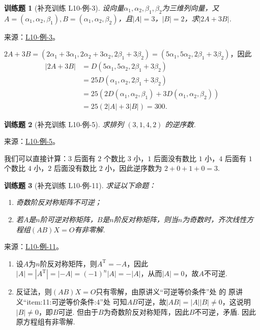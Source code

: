 \documentclass[UTF8,12pt,a4paper,fontset=fandol]{ctexart}
\newtheorem{exercise}{训练题}[section]
\begin{document}
\begin{exercise}[补充训练 L10-例-3]\label{prob:L10-例-3}
设向量$\alpha_1,\alpha_2,\beta_1,\beta_2$为三维列向量，又$A=(\alpha_1,\alpha_2,\beta_1),B=(\alpha_1,\alpha_2,\beta_2)$，且$|A|=3$，$|B|=2$，求$|2A+3B|$.
\end{exercise}
\noindent 来源：\href{https://github.com/yhwu-is/Linear-Algebra-Left-Undone/blob/new/%E8%AE%B2%E4%B9%89/%E4%B8%93%E9%A2%98/10%20%E8%A1%8C%E5%88%97%E5%BC%8F.tex}{L10-例-3}。
\begin{solve}
$2A+3B=(2\alpha_1+3\alpha_1,2\alpha_2+3\alpha_2,2\beta_1+3\beta_2)=(5\alpha_1,5\alpha_2,2\beta_1+3\beta_2)$，因此
    \begin{align*}
        |2A+3B| & =D(5\alpha_1,5\alpha_2,2\beta_1+3\beta_2)                        \\
                & =25D(\alpha_1,\alpha_2,2\beta_1+3\beta_2)                        \\
                & =25(2D(\alpha_1,\alpha_2,\beta_1)+3D(\alpha_1,\alpha_2,\beta_2)) \\
                & =25(2|A|+3|B|)=300.
    \end{align*}
\end{solve}

\begin{exercise}[补充训练 L10-例-5]\label{prob:L10-例-5}
求排列 $(3,1,4,2)$ 的逆序数.
\end{exercise}
\noindent 来源：\href{https://github.com/yhwu-is/Linear-Algebra-Left-Undone/blob/new/%E8%AE%B2%E4%B9%89/%E4%B8%93%E9%A2%98/10%20%E8%A1%8C%E5%88%97%E5%BC%8F.tex}{L10-例-5}。
\begin{solve}
我们可以直接计算：$3$ 后面有 $2$ 个数比 $3$ 小，$1$ 后面没有数比 $1$ 小，$4$ 后面有 $1$ 个数比 $4$ 小，$2$ 后面没有数比 $2$ 小，因此逆序数为 $2+0+1+0=3$.
\end{solve}

\begin{exercise}[补充训练 L10-例-11]\label{prob:L10-例-11}
求证以下命题：
    \begin{enumerate}
        \item 奇数阶反对称矩阵不可逆；

        \item 若$A$是$n$阶可逆对称矩阵，$B$是$n$阶反对称矩阵，则当$n$为奇数时，齐次线性方程组$(AB)X=O$有非零解.
    \end{enumerate}
\end{exercise}
\noindent 来源：\href{https://github.com/yhwu-is/Linear-Algebra-Left-Undone/blob/new/%E8%AE%B2%E4%B9%89/%E4%B8%93%E9%A2%98/10%20%E8%A1%8C%E5%88%97%E5%BC%8F.tex}{L10-例-11}。
\begin{solve}
\begin{enumerate}
        \item 设$A$为$n$阶反对称矩阵，则$A^\mathrm{T}=-A$，因此$|A|=|A^\mathrm{T}|=|-A|=(-1)^n|A|=-|A|$，从而$|A|=0$，故$A$不可逆.
        \item 反证法，则$(AB)X=O$只有零解，由原讲义“可逆等价条件”处 的 原讲义“item:11:可逆等价条件:4”处 可知$AB$可逆，故$|AB|=|A||B|\neq 0$，这说明$|B|\neq 0$，即$B$可逆. 但由于$B$为奇数阶反对称矩阵，因此$B$不可逆，矛盾. 因此原方程组有非零解.
    \end{enumerate}
\end{solve}
\end{document}
